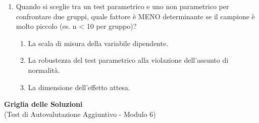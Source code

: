 \documentclass[12pt, a4paper]{article}
\begin{document}
\begin{enumerate}
    \item Quando si sceglie tra un test parametrico e uno non parametrico per confrontare due gruppi, quale fattore è MENO determinante se il campione è molto piccolo (es. n < 10 per gruppo)?
    \begin{enumerate}
        \item La scala di misura della variabile dipendente.
        \item La robustezza del test parametrico alla violazione dell'assunto di normalità.
        \item La dimensione dell'effetto attesa.
    \end{enumerate}
    \vspace{0.5cm}

\end{enumerate} %

\newpage %

\begin{center}
    \Large\textbf{Griglia delle Soluzioni} \\
    \vspace{0.5cm}
    \normalsize{(Test di Autovalutazione Aggiuntivo - Modulo 6)}
\end{center}
\vspace{1cm}
\end{document}
